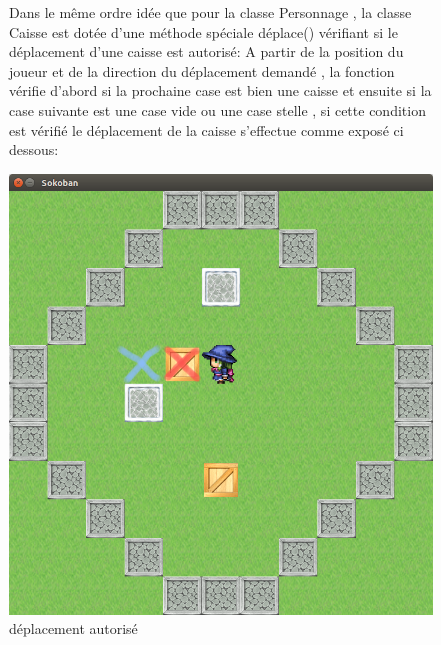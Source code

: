\documentclass{article}
\begin{document}
				
				
				
	\begin{figure}		
	
Dans le même ordre idée que pour la classe Personnage , la classe Caisse est dotée d'une méthode spéciale déplace() vérifiant si le déplacement d'une caisse est autorisé:
 A partir de la position du joueur et de la direction du déplacement demandé , la fonction vérifie d'abord si la prochaine case est bien une caisse et ensuite si la case suivante est une case vide ou une case stelle , si cette condition est vérifié le déplacement de la caisse s'effectue comme exposé ci dessous:

	\begin{center}
	\begin{minipage}[b]{0.4\textwidth}
    \includegraphics[width=\textwidth]{../Screenshots/02.png}
    \caption{déplacement autorisé}
  \end{minipage}
  \hfill
  \begin{minipage}[b]{0.4\textwidth}

\end{minipage}
\end{center}
\end{figure}
\end{document}
